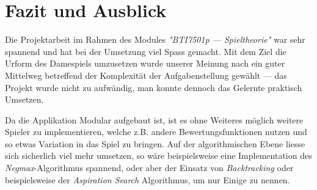 \section{Fazit und Ausblick}
\label{chap:ending}

Die Projektarbeit im Rahmen des Modules \textit{"BTI7501p --- Spieltheorie"} war sehr spannend und hat bei der Umsetzung viel Spass gemacht. Mit dem Ziel die Urform des Damespiels umzusetzen wurde unserer Meinung nach ein guter Mittelweg betreffend der Komplexität der Aufgabenstellung gewählt --- das Projekt wurde nicht zu aufwändig, man konnte dennoch das Gelernte praktisch Umsetzen.

Da die Applikation Modular aufgebaut ist, ist es ohne Weiteres möglich weitere Spieler zu implementieren, welche z.B. andere Bewertungsfunktionen nutzen und so etwas Variation in das Spiel zu bringen. Auf der algorithmischen Ebene liesse sich sicherlich viel mehr umsetzen, so wäre beispielsweise eine Implementation des \textit{Negmax}-Algorithmus spannend, oder aber der Einsatz von \textit{Backtracking} oder beispielsweise der \textit{Aspiration Search} Algorithmus, um nur Einige zu nennen.
